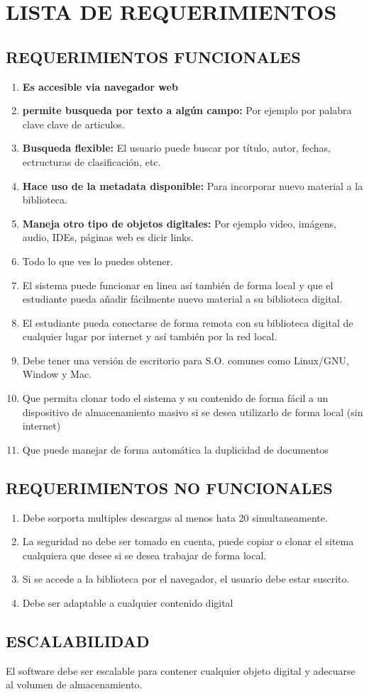\chapter{LISTA DE REQUERIMIENTOS}
\section{REQUERIMIENTOS FUNCIONALES}
\begin{enumerate}
	\item \textbf{Es accesible via navegador web}
	\item \textbf{permite busqueda por texto a algún campo: }Por ejemplo por palabra clave clave de articulos.
	\item \textbf{Busqueda flexible:} El usuario puede buscar por título, autor, fechas, ectructuras de clasificación, etc. 
	\item \textbf{Hace uso de la metadata disponible: } Para incorporar nuevo material a la biblioteca. 
	\item \textbf{Maneja otro tipo de objetos digitales: } Por ejemplo video, imágens, audio, IDEs, páginas web es dicir links.
	\item Todo lo que ves lo puedes obtener.
	\item El sistema puede funcionar en linea así también de forma local y que el estudiante pueda añadir fácilmente nuevo material a su biblioteca digital. 
	\item El estudiante pueda conectarse de forma remota con su biblioteca digital de cualquier lugar por internet y así también por la red local. 
	\item Debe tener una versión de escritorio para S.O. comunes como Linux/GNU, Window y Mac. 
	\item Que permita clonar todo el sistema y su contenido de forma fácil a un dispositivo de almacenamiento masivo si se desea utilizarlo de forma local (sin internet)
	\item Que puede manejar  de forma automática  la duplicidad de documentos
\end{enumerate}

\section{REQUERIMIENTOS NO FUNCIONALES}
\begin{enumerate}
	\item Debe sorporta multiples descargas al menos hata 20 simultaneamente. 
	\item La seguridad no debe ser tomado en cuenta, puede copiar o clonar el sitema cualquiera que desee si se desea trabajar de forma local. 
	\item Si se accede a la biblioteca por el navegador, el usuario debe estar suscrito. 
	\item Debe ser adaptable a cualquier contenido digital
\end{enumerate}
\section{ESCALABILIDAD} El software debe ser escalable para contener cualquier objeto digital y adecuarse al volumen de almacenamiento.